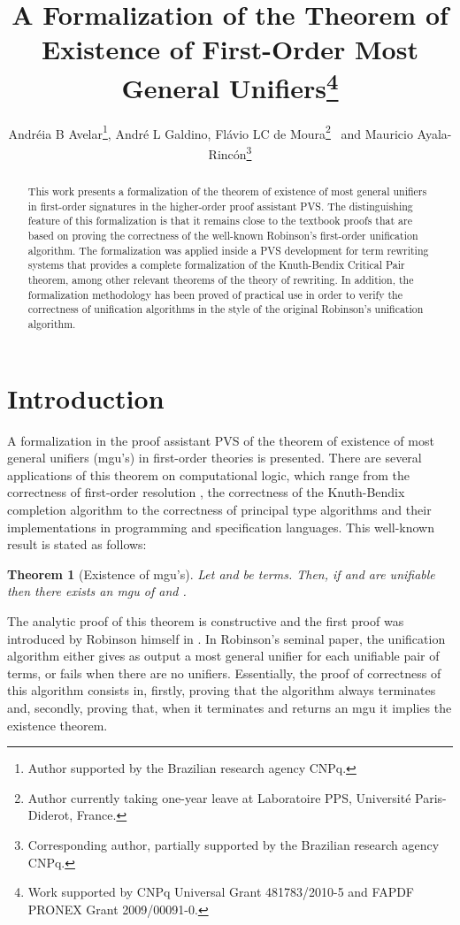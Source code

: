 \documentclass[submission,copyright,creativecommons]{eptcs}
\title{A Formalization of the Theorem of Existence of First-Order Most
  General Unifiers\thanks{Work supported by CNPq Universal Grant 481783/2010-5 and FAPDF PRONEX Grant 2009/00091-0.}}
\author{Andr\'eia B Avelar\thanks{Author supported by the Brazilian
    research agency CNPq.}, Andr\'{e} L Galdino, Fl\'avio LC de
  Moura\thanks{Author currently taking one-year leave at Laboratoire PPS,  Universit\'e Paris-Diderot, France.}~
   and Mauricio Ayala-Rinc\'{o}n\thanks{Corresponding author, partially supported
    by the Brazilian research agency CNPq.}
\institute{Departamentos de Matem\'atica e Ci\^encia da Computa\c{c}\~ao,
  Universidade de Bras\'ilia, Bras\'ilia, Brazil \\
Departamento de Matem\'atica, 
  Universidade Federal de Goi\'{a}s, Catal\~ao, Brazil} 
\email{\{andreia@mat., flaviomoura@, galdino@, ayala@\}unb.br}
}
\newtheorem{theorem}{Theorem}
\begin{document}
\maketitle

\begin{abstract}
  This work presents a formalization of the theorem of existence of
  most general unifiers in first-order signatures in the higher-order
  proof assistant PVS. The distinguishing feature of this
  formalization is that it remains close to the textbook proofs that
  are based on proving the correctness of the well-known Robinson's
  first-order unification algorithm. The formalization was applied
  inside a PVS development for term rewriting systems that provides a
  complete formalization of the Knuth-Bendix Critical Pair theorem,
  among other relevant theorems of the theory of rewriting. In
  addition, the formalization methodology has been proved of practical
  use in order to verify the correctness of unification algorithms in
  the style of the original Robinson's unification algorithm.
\end{abstract}

\section{Introduction}

A formalization in the proof assistant PVS of the theorem of existence
of most general unifiers (mgu's) in first-order theories is
presented. There are several applications of this theorem on
computational logic, which range from the correctness of first-order
resolution \cite{Ro65}, the correctness of the Knuth-Bendix completion
algorithm \cite{KnBe70} to the correctness of principal type
algorithms \cite{Hi69} and their implementations in programming and
specification languages. This well-known result is stated as follows:

\begin{theorem}[Existence of mgu's]
  \label{existence-mgu}
  Let  and  be terms. Then, if  and  are unifiable then
  there exists an mgu of  and .
\end{theorem}

The analytic proof of this theorem is constructive and the first proof
was introduced by Robinson himself in \cite{Ro65}. In Robinson's
seminal paper, the unification algorithm either gives as output a most
general unifier for each unifiable pair of terms, or fails when there
are no unifiers.  Essentially, the proof of correctness of this
algorithm consists in, firstly, proving that the algorithm always
terminates and, secondly, proving that, when it terminates and returns
an mgu it implies the existence theorem.
\end{document}
